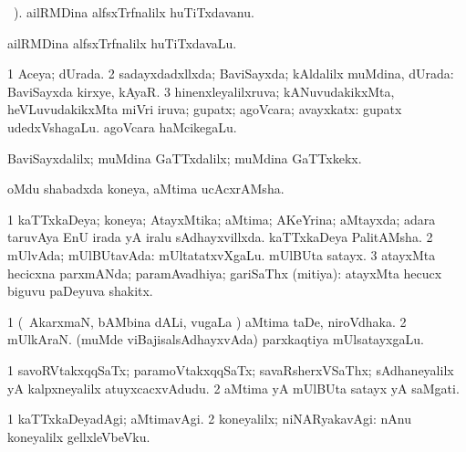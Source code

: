{\bentry
{} 
\gl{\nA}
\bava\ ). \bmng
ailRMDina alfsxTrfnalilx huTiTxdavanu. 
\emng
\eentry

\bentry
{} 
\gl{\nA}
\expl{}
\bmng
ailRMDina alfsxTrfnalilx huTiTxdavaLu. 
\emng
\eentry

\bentry
{}
\gl{\saMkiSx}
\expl{}
\bmng
{} 
\emng
\eentry

\bentry
{} 
\gl{\gu}
\expl{}
\bmng
\bnum
\num{1} Aceya; dUrada. 
\num{2} sadayxdadxllxda; BaviSayxda; kAldalilx muMdina, dUrada:  BaviSayxda kirxye, kAyaR. 
\num{3} hinenxleyalilxruva; kANuvudakikxMta, heVLuvudakikxMta miVri iruva; gupatx; agoVcara; avayxkatx:  gupatx udedxVshagaLu.  agoVcara haMcikegaLu. 
\enum
\emng
\eentry

\bentry
{} 
\gl{\kirxvi}
\expl{}
\bmng
BaviSayxdalilx; muMdina GaTTxdalilx; muMdina GaTTxkekx. 
\emng
\eentry

\bentry
{} 
\gl{\nA}
\expl{}
\bmng
oMdu shabadxda koneya, aMtima ucAcxrAMsha. 
\emng
\eentry

\bentry
{} 
\gl{\gu}
\expl{}
\bmng
\bnum
\num{1} kaTTxkaDeya; koneya; AtayxMtika; aMtima; AKeYrina; aMtayxda; adara taruvAya EnU irada yA iralu sAdhayxvillxda.  kaTTxkaDeya PalitAMsha. 
\num{2} mUlvAda; mUlBUtavAda:  mUltatatxvXgaLu.  mUlBUta satayx. 
\num{3} atayxMta hecicxna parxmANda; paramAvadhiya; gariSaThx (mitiya):  atayxMta hecucx biguvu paDeyuva shakitx. 
\enum
\emng

\noindent
\gl{\pagu}
\expl{}
\bmng
\bnum
\num{1}  (\kanmu\ AkarxmaN, bAMbina dALi, \mo vugaLa \vi) aMtima taDe, niroVdhaka. 
\num{2}  mUlkAraN.  (muMde viBajisalsAdhayxvAda) parxkaqtiya mUlsatayxgaLu. 
\enum
\emng
\eentry

\bentry
{} 
\gl{\nA}
\expl{}
\bmng
\bnum
\num{1} savoRVtakxqqSaTx; paramoVtakxqqSaTx; savaRsherxVSaThx; sAdhaneyalilx yA kalpxneyalilx atuyxcacxvAdudu. 
\num{2} aMtima yA mUlBUta satayx yA saMgati. 
\enum
\emng
\eentry

\bentry
{} 
\gl{\kirxvi}
\expl{}
\bmng
\bnum
\num{1} kaTTxkaDeyadAgi; aMtimavAgi. 
\num{2} koneyalilx; niNARyakavAgi:  nAnu koneyalilx gellxleVbeVku. 
\enum
\emng
\eentry

}
